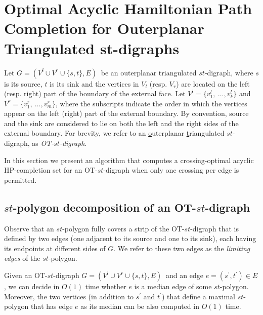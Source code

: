 \documentclass{myllncs-mixalis}
\begin{document}
\section{Optimal Acyclic Hamiltonian Path Completion for Outerplanar Triangulated st-digraphs}
Let $G=(V^l \cup V^r \cup \{s,t\}, E)~$ be an outerplanar
triangulated $st$-digraph, where $s$ is its source, $t$ is its sink
and  the vertices in $V_l$ (resp. $V_r$) are located on the left
(resp. right) part of the boundary of the external face. Let $V^l =
\{ v^l_1,~\ldots, v^l_k\}$ and $V^r = \{  v^r_1,~\ldots, v^r_m\}$,
where the subscripts indicate the order in which the vertices appear
on the left (right) part of the external boundary. By convention,
source and the sink are considered to lie on both the left and the
right sides of the external boundary. For brevity, we refer to an
\underline{o}uterplanar \underline{t}riangulated $st$-digraph, as
\emph{OT-$st$-digraph}.



In this section we present an algorithm that computes a
crossing-optimal acyclic HP-completion set  for an OT-$st$-digraph
when only one crossing per edge  is permitted.

\subsection{$st$-polygon decomposition of an OT-$st$-digraph}

Observe that an $st$-polygon fully covers a strip of the
OT-$st$-digraph that is defined by two edges (one adjacent to its
source and one to its sink), each having its endpoints at different
sides of $G$. We refer to these two edges as the \emph{limiting
edges} of the $st$-polygon.

\begin{lemma}
\label{lem:medianComputation} Given an OT-$st$-digraph $G=(V^l \cup
V^r \cup \{s,t\}, E)~$ and an edge $e=(s^\prime, t^\prime) \in E$,
we can decide in $O(1)$ time whether $e$ is a median edge of some
$st$-polygon. Moreover, the two vertices (in addition to $s^\prime$
and $t^\prime$) that define
 a maximal $st$-polygon that has edge $e$ as its median can be also computed in $O(1)$ time.
\end{lemma}
\end{document}
